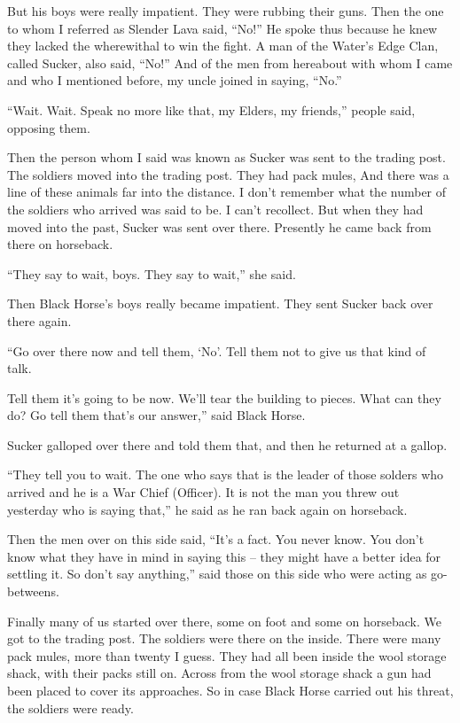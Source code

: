 But his boys were really impatient. They were rubbing their guns. Then the one to whom I referred as Slender Lava said, ``No!'' He spoke thus because he knew they lacked the wherewithal to win the fight. A man of the Water's Edge Clan, called Sucker, also said, ``No!'' And of the men from hereabout with whom I came and who I mentioned before, my uncle joined in saying, ``No.''

``Wait. Wait. Speak no more like that, my Elders, my friends,'' people said, opposing them.

Then the person whom I said was known as Sucker was sent to the trading post. The soldiers moved into the trading post. They had pack mules, And there was a line of these animals far into the distance. I don't remember what the number of the soldiers who arrived was said to be. I can't recollect. But when they had moved into the past, Sucker was sent over there. Presently he came back from there on horseback.

``They say to wait, boys. They say to wait,'' she said.

Then Black Horse's boys really became impatient. They sent Sucker back over there again.

``Go over there now and tell them, `No'. Tell them not to give us that kind of talk.

Tell them it's going to be now. We'll tear the building to pieces. What can they do? Go tell them that's our answer,'' said Black Horse.

Sucker galloped over there and told them that, and then he returned at a gallop.

``They tell you to wait. The one who says that is the leader of those solders who arrived and he is a War Chief (Officer). It is not the man you threw out yesterday who is saying that,'' he said as he ran back again on horseback.

Then the men over on this side said, ``It's a fact. You never know. You don't know what they have in mind in saying this -- they might have a better idea for settling it. So don't say anything,'' said those on this side who were acting as go-betweens.

Finally many of us started over there, some on foot and some on horseback. We got to the trading post. The soldiers were there on the inside. There were many pack mules, more than twenty I guess. They had all been inside the wool storage shack, with their packs still on. Across from the wool storage shack a gun had been placed to cover its approaches. So in case Black Horse carried out his threat, the soldiers were ready.

